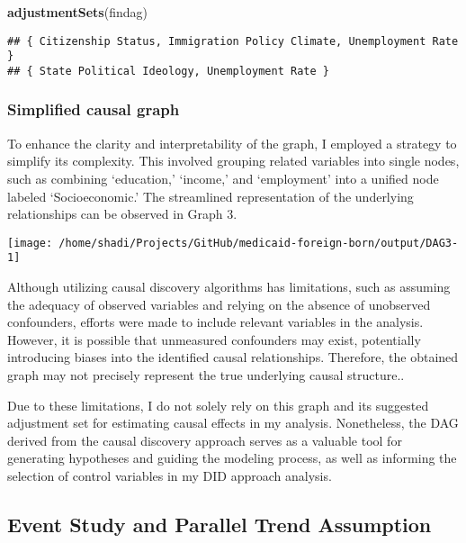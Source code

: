 \documentclass[
]{article}
\newenvironment{Shaded}{\begin{snugshade}}{\end{snugshade}}
\newcommand{\FunctionTok}[1]{\textcolor[rgb]{0.13,0.29,0.53}{\textbf{#1}}}
\newcommand{\NormalTok}[1]{#1}
\begin{document}
\begin{Shaded}
\begin{Highlighting}[]
\FunctionTok{adjustmentSets}\NormalTok{(findag)}
\end{Highlighting}
\end{Shaded}

\begin{verbatim}
## { Citizenship Status, Immigration Policy Climate, Unemployment Rate }
## { State Political Ideology, Unemployment Rate }
\end{verbatim}

\hypertarget{simplified-causal-graph}{%
\subsubsection{Simplified causal graph}\label{simplified-causal-graph}}

To enhance the clarity and interpretability of the graph, I employed a
strategy to simplify its complexity. This involved grouping related
variables into single nodes, such as combining `education,' `income,'
and `employment' into a unified node labeled `Socioeconomic.' The
streamlined representation of the underlying relationships can be
observed in Graph 3.

\begin{center}\texttt{[image: /home/shadi/Projects/GitHub/medicaid-foreign-born/output/DAG3-1]} \end{center}

Although utilizing causal discovery algorithms has limitations, such as
assuming the adequacy of observed variables and relying on the absence
of unobserved confounders, efforts were made to include relevant
variables in the analysis. However, it is possible that unmeasured
confounders may exist, potentially introducing biases into the
identified causal relationships. Therefore, the obtained graph may not
precisely represent the true underlying causal structure..

Due to these limitations, I do not solely rely on this graph and its
suggested adjustment set for estimating causal effects in my analysis.
Nonetheless, the DAG derived from the causal discovery approach serves
as a valuable tool for generating hypotheses and guiding the modeling
process, as well as informing the selection of control variables in my
DID approach analysis.

\hypertarget{event-study-and-parallel-trend-assumption}{%
\subsection{Event Study and Parallel Trend
Assumption}\label{event-study-and-parallel-trend-assumption}}
\end{document}
